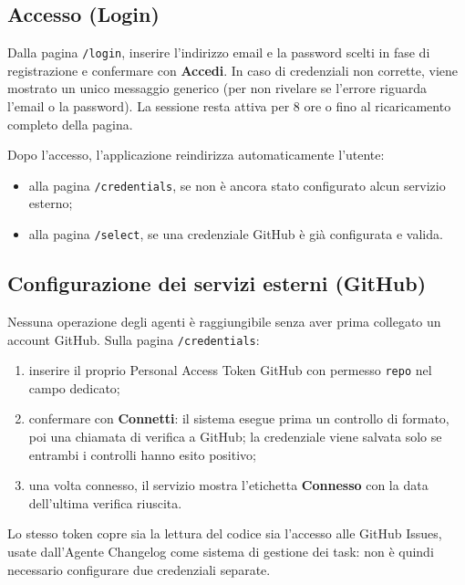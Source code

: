 \documentclass[11pt,a4paper]{article}
\newcommand{\route}[1]{\texttt{#1}}
\newcommand{\code}[1]{\texttt{#1}}
\begin{document}
\subsection{Accesso (Login)}

Dalla pagina \route{/login}, inserire l'indirizzo email e la password scelti in fase di
registrazione e confermare con \textbf{Accedi}. In caso di credenziali non corrette, viene
mostrato un unico messaggio generico (per non rivelare se l'errore riguarda l'email o la
password). La sessione resta attiva per 8 ore o fino al ricaricamento completo della pagina.

Dopo l'accesso, l'applicazione reindirizza automaticamente l'utente:

\begin{itemize}
  \item alla pagina \route{/credentials}, se non è ancora stato configurato alcun servizio
        esterno;
  \item alla pagina \route{/select}, se una credenziale GitHub è già configurata e valida.
\end{itemize}

\subsection{Configurazione dei servizi esterni (GitHub)}
\label{sec:credenziali}

Nessuna operazione degli agenti è raggiungibile senza aver prima collegato un account
GitHub. Sulla pagina \route{/credentials}:

\begin{enumerate}
  \item inserire il proprio Personal Access Token GitHub con permesso \code{repo} nel
        campo dedicato;
  \item confermare con \textbf{Connetti}: il sistema esegue prima un controllo di formato,
        poi una chiamata di verifica a GitHub; la credenziale viene salvata solo se
        entrambi i controlli hanno esito positivo;
  \item una volta connesso, il servizio mostra l'etichetta \textbf{Connesso} con la data
        dell'ultima verifica riuscita.
\end{enumerate}

Lo stesso token copre sia la lettura del codice sia l'accesso alle GitHub Issues, usate
dall'Agente Changelog come sistema di gestione dei task: non è quindi necessario configurare
due credenziali separate.
\end{document}
